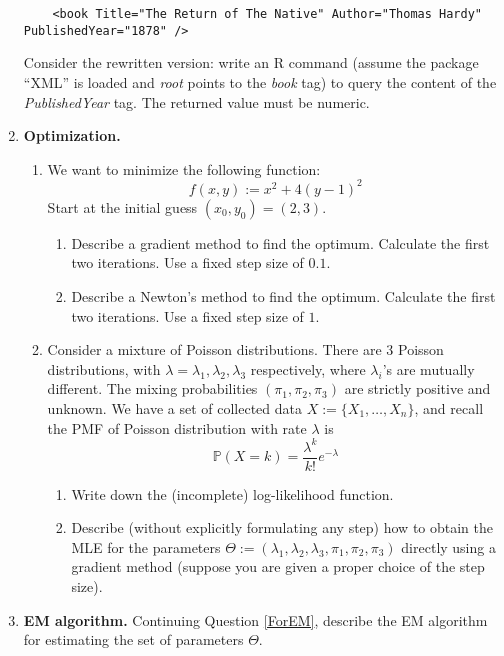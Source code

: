 \documentclass[11pt]{article}
\newcommand{\pr}{\mathbb{P}}
\begin{document}
\begin{enumerate}
\begin{verbatim}
	<book Title="The Return of The Native" Author="Thomas Hardy" PublishedYear="1878" />
	\end{verbatim}
	Consider the rewritten version: write an R command (assume the package ``XML'' is loaded and \emph{root} points to the \emph{book} tag) to query the content of the \emph{PublishedYear} tag. The returned value must be numeric.
	\item {\bf Optimization.}
	\begin{enumerate}
		\item We want to minimize the following function:
		$$
		f(x, y) := x^2 + 4(y-1)^2
		$$
		Start at the initial guess $(x_0,y_0)=(2, 3)$.
		\begin{enumerate}
			\item Describe a gradient method to find the optimum. Calculate the first two iterations. Use a fixed step size of $0.1$.
			\item Describe a Newton's method to find the optimum. Calculate the first two iterations. Use a fixed step size of $1$.
		\end{enumerate}
		\item\label{ForEM} Consider a mixture of Poisson distributions. There are 3 Poisson distributions, with $\lambda=\lambda_1, \lambda_2, \lambda_3$ respectively, where $\lambda_i$'s are mutually different. The mixing probabilities $(\pi_1, \pi_2, \pi_3)$ are strictly positive and unknown. We have a set of collected data $X:=\{ X_1,\ldots,X_n \}$, and recall the PMF of Poisson distribution with rate $\lambda$ is
		$$
			\pr\left(X=k\right) = \frac{\lambda^k}{k!}e^{-\lambda}
		$$
		\begin{enumerate}
			\item Write down the (incomplete) log-likelihood function.
			\item Describe (without explicitly formulating any step) how to obtain the MLE for the parameters $\Theta:=(\lambda_1, \lambda_2, \lambda_3, \pi_1, \pi_2, \pi_3)$ directly using a gradient method (suppose you are given a proper choice of the step size).
		\end{enumerate}
	\end{enumerate}
	\item {\bf EM algorithm.} Continuing Question \ref{ForEM}, describe the EM algorithm for estimating the set of parameters $\Theta$.
\end{enumerate}
\end{document}
